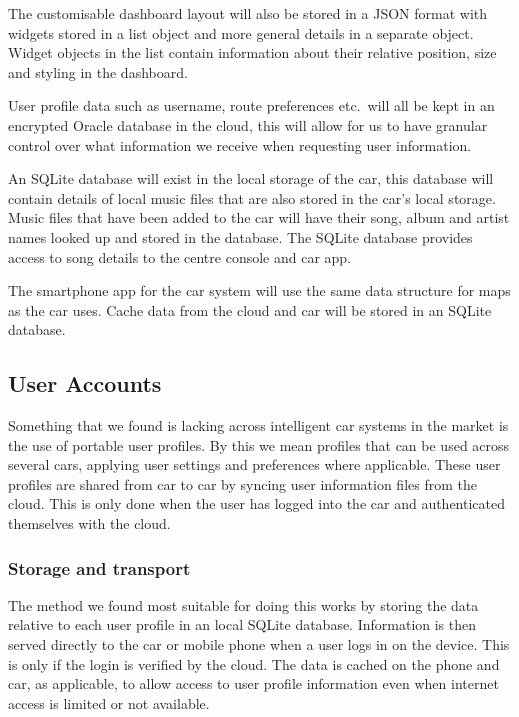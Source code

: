 \documentclass{article}
\begin{document}
The customisable dashboard layout will also be stored in a JSON format with widgets stored in a list object and more general details in a separate object. Widget objects in the list contain information about their relative position, size and styling in the dashboard.

User profile data such as username, route preferences etc.\ will all be kept in an encrypted Oracle database in the cloud, this will allow for us to have granular control over what information we receive when requesting user information.

An SQLite database will exist in the local storage of the car, this database will contain details of local music files that are also stored in the car's local storage. Music files that have been added to the car will have their song, album and artist names looked up and stored in the database. The SQLite database provides access to song details to the centre console and car app.

The smartphone app for the car system will use the same data structure for maps as the car uses. Cache data from the cloud and car will be stored in an SQLite database.

\subsection{User Accounts}\label{ssec:user-accounts} %
Something that we found is lacking across intelligent car systems in the market is the use of portable user profiles. By this we mean profiles that can be used across several cars, applying user settings and preferences where applicable.
These user profiles are shared from car to car by syncing user information files from the cloud. This is only done when the user has logged into the car and authenticated themselves with the cloud.
\subsubsection{Storage and transport}
The method we found most suitable for doing this works by storing the data relative to each user profile in an local SQLite database. Information is then served directly to the car or mobile phone when a user logs in on the device. This is only if the login is verified by the cloud. The data is cached on the phone and car, as applicable, to allow access to user profile information even when internet access is limited or not available.
\end{document}
